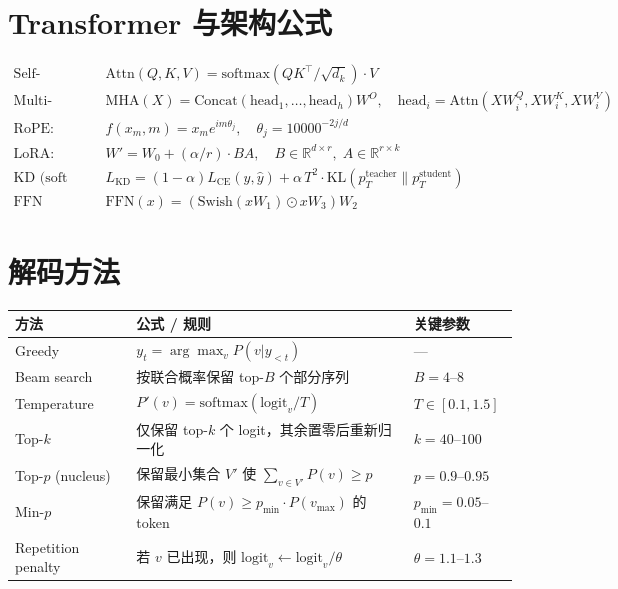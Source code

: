 \section{Transformer 与架构公式}
\label{transformer-architecture-formulas}

\begin{align}
\text{Self-Attention:}&\quad \text{Attn}(Q,K,V) = \text{softmax}(QK^\top / \sqrt{d_k}) \cdot V \\
\text{Multi-Head:}&\quad \text{MHA}(X) = \text{Concat}(\text{head}_1, \ldots, \text{head}_h)W^O,\quad \text{head}_i = \text{Attn}(XW_i^Q, XW_i^K, XW_i^V) \\
\text{RoPE:}&\quad f(x_m, m) = x_m e^{im\theta_j}, \quad \theta_j = 10000^{-2j/d} \\
\text{LoRA:}&\quad W' = W_0 + (\alpha/r) \cdot BA, \quad B \in \mathbb{R}^{d \times r},\; A \in \mathbb{R}^{r \times k} \\
\text{KD (soft targets):}&\quad L_\text{KD} = (1{-}\alpha)L_\text{CE}(y, \hat{y}) + \alpha\, T^2 \cdot \text{KL}(p_T^\text{teacher} \| p_T^\text{student}) \\
\text{FFN (SwiGLU):}&\quad \text{FFN}(x) = (\text{Swish}(xW_1) \odot xW_3) W_2
\end{align}

\section{解码方法}
\label{decoding-methods}

\noindent\begin{tabularx}{\linewidth}{@{}l Z{1.42} Z{0.58}@{}}
\toprule
\textbf{方法} & \textbf{公式 / 规则} & \textbf{关键参数} \\
\midrule
Greedy & $y_t = \arg\max_v P(v|y_{<t})$ & --- \\
Beam search & 按联合概率保留 top-$B$ 个部分序列 & $B=4$--$8$ \\
Temperature & $P'(v) = \text{softmax}(\text{logit}_v / T)$ & $T \in [0.1, 1.5]$ \\
Top-$k$ & 仅保留 top-$k$ 个 logit，其余置零后重新归一化 & $k=40$--$100$ \\
Top-$p$ (nucleus) & 保留最小集合 $V'$ 使 $\sum_{v \in V'} P(v) \geq p$ & $p=0.9$--$0.95$ \\
Min-$p$ & 保留满足 $P(v) \geq p_\text{min} \cdot P(v_\text{max})$ 的 token & $p_\text{min}=0.05$--$0.1$ \\
Repetition penalty & 若 $v$ 已出现，则 $\text{logit}_v \leftarrow \text{logit}_v / \theta$ & $\theta=1.1$--$1.3$ \\
\bottomrule
\end{tabularx}

